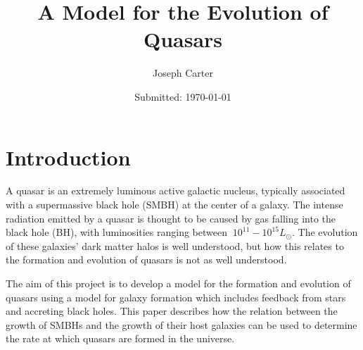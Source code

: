 \documentclass[12pt, twocolumn]{revtex4}    %
\begin{document}
                     


\title{A Model for the Evolution of Quasars} 
\date{Submitted: \today{}}
\author{Joseph Carter}

 



\maketitle
\onecolumngrid


\tableofcontents
\newpage
\twocolumngrid


\section{Introduction}

A quasar is an extremely luminous active galactic nucleus, typically associated with a supermassive black hole (SMBH) at the center of a galaxy. The intense radiation emitted by a quasar is thought to be caused by gas falling into the black hole (BH), with luminosities ranging between $~10^{11} - 10^{15}L_\odot$. The evolution of these galaxies' dark matter halos is well understood, but how this relates to the formation and evolution of quasars is not as well understood.\par

The aim of this project is to develop a model for the formation and evolution of quasars using a model for galaxy formation which includes feedback from stars and accreting black holes. This paper describes how the relation between the growth of SMBHs and the growth of their host galaxies can be used to determine the rate at which quasars are formed in the universe.
\end{document}
